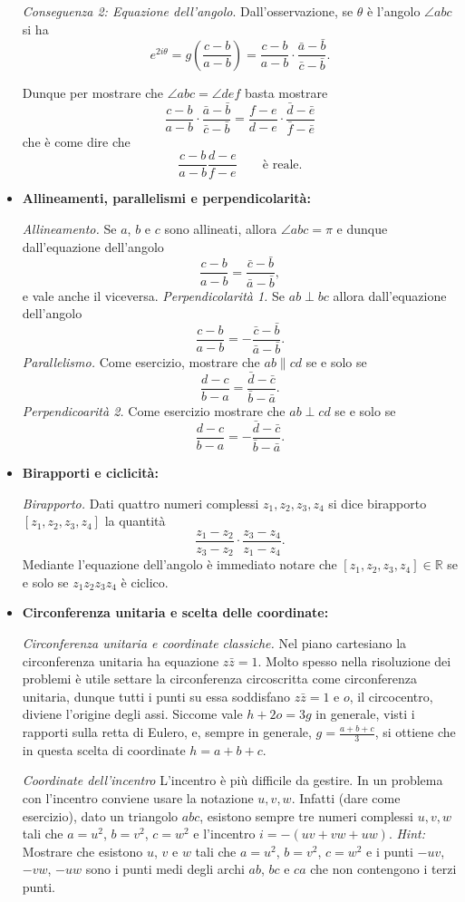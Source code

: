 \begin{itemize}
\emph{Conseguenza 2: Equazione dell'angolo}. Dall'osservazione, se $\theta$ è l'angolo $\angle abc$ si ha 
$$
e^{2i\theta}=g\left(\frac{c-b}{a-b}\right)=\frac{c-b}{a-b}\cdot \frac{\bar a-\bar b}{\bar c-\bar b}.
$$

Dunque per mostrare che $\angle abc=\angle def$ basta mostrare 
$$
\frac{c-b}{a-b}\cdot \frac{\bar a-\bar b}{\bar c-\bar b}=\frac{f-e}{d-e}\cdot \frac{\bar d-\bar e}{\bar f-\bar e}
$$
che è come dire che
$$
\frac{c-b}{a-b}\frac{d-e}{f-e} \qquad \mbox{è reale}.
$$
\item \textbf{Allineamenti, parallelismi e perpendicolarità:}

\emph{Allineamento.} Se $a$, $b$ e $c$ sono allineati, allora $\angle abc=\pi$ e dunque dall'equazione dell'angolo 
$$
\frac{c-b}{a-b}=\frac{\bar c-\bar b}{\bar a-\bar b},
$$
e vale anche il viceversa. 
\emph{Perpendicolarità 1.} Se $ab\perp bc$ allora dall'equazione dell'angolo 
$$
\frac{c-b}{a-b}=-\frac{\bar c-\bar b}{\bar a-\bar b}.
$$
\emph{Parallelismo.} Come esercizio, mostrare che $ab\parallel cd$ se e solo se 
$$
\frac{d-c}{b-a}=\frac{\bar d-\bar c}{\bar b-\bar a}.
$$
\emph{Perpendicoarità 2.} Come esercizio mostrare che $ab\perp cd$ se e solo se 
$$
\frac{d-c}{b-a}=-\frac{\bar d-\bar c}{\bar b-\bar a}.
$$
\item \textbf{Birapporti e ciclicità:}

\emph{Birapporto.} Dati quattro numeri complessi $z_1,z_2,z_3,z_4$ si dice birapporto $[z_1,z_2,z_3,z_4]$ la quantità
$$
\frac{z_1-z_2}{z_3-z_2}\cdot \frac{z_3-z_4}{z_1-z_4}.
$$
Mediante l'equazione dell'angolo è immediato notare che $[z_1,z_2,z_3,z_4] \in \mathbb R$ se e solo se $z_1z_2z_3z_4$ è ciclico.

\item \textbf{Circonferenza unitaria e scelta delle coordinate:}
 
\emph{Circonferenza unitaria e coordinate classiche.} Nel piano cartesiano la circonferenza unitaria ha equazione $z\bar z=1$. Molto spesso nella risoluzione dei problemi è utile settare la circonferenza circoscritta come circonferenza unitaria, dunque tutti i punti su essa soddisfano $z\bar z=1$ e $o$, il circocentro, diviene l'origine degli assi. Siccome vale $h+2o=3g$ in generale, visti i rapporti sulla retta di Eulero, e, sempre in generale, $g=\frac{a+b+c}{3}$, si ottiene che in questa scelta di coordinate $h=a+b+c$.

\emph{Coordinate dell'incentro} L'incentro è più difficile da gestire. In un problema con l'incentro conviene usare la notazione $u,v,w$. Infatti (dare come esercizio), dato un triangolo $abc$, esistono sempre tre numeri complessi $u,v,w$ tali che $a=u^2$, $b=v^2$, $c=w^2$ e l'incentro $i=-(uv+vw+uw)$. \emph{Hint:} Mostrare che esistono $u$, $v$ e $w$ tali che $a=u^2$, $b=v^2$, $c=w^2$ e i punti $-uv$, $-vw$, $-uw$ sono i punti medi degli archi $ab$, $bc$ e $ca$ che non contengono i terzi punti. 


\end{itemize}
